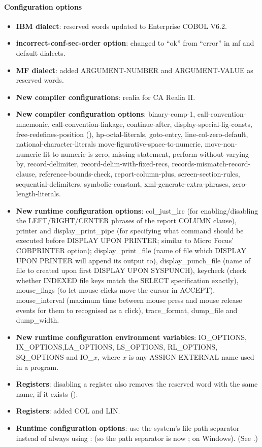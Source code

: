 \paragraph{Configuration options}
\begin{itemize}
\item \textbf{IBM dialect}: reserved words updated to Enterprise COBOL V6.2.
\item \textbf{incorrect-conf-sec-order option}: changed to ``ok'' from ``error'' in mf and default dialects.
\item \textbf{MF dialect}: added ARGUMENT-NUMBER and ARGUMENT-VALUE as reserved words.
\item \textbf{New compiler configurations}: realia for CA Realia II.
\item \textbf{New compiler configuration options}: binary-comp-1, call-convention-mnemonic, call-convention-linkage, continue-after, display-special-fig-consts, free-redefines-position (), hp-octal-literals, goto-entry, line-col-zero-default, national-character-literals move-figurative-space-to-numeric, move-non-numeric-lit-to-numeric-is-zero, missing-statement, perform-without-varying-by, record-delimiter, record-delim-with-fixed-recs, records-mismatch-record-clause, reference-bounds-check, report-column-plus, screen-section-rules, sequential-delimiters, symbolic-constant, xml-generate-extra-phrases, zero-length-literals.
\item \textbf{New runtime configuration options}: col\_just\_lrc (for enabling\slash{}disabling the LEFT\slash{}RIGHT\slash{}CENTER phrases of the report COLUMN clause), printer and display\_print\_pipe (for specifying what command should be executed before DISPLAY UPON PRINTER; similar to Micro Focus' COBPRINTER option); display\_print\_file (name of file which DISPLAY UPON PRINTER will append its output to), display\_punch\_file (name of file to created upon first DISPLAY UPON SYSPUNCH), keycheck (check whether INDEXED file keys match the SELECT specification exactly), mouse\_flags (to let mouse clicks move the cursor in ACCEPT), mouse\_interval (maximum time between mouse press and mouse release events for them to recognised as a click), trace\_format, dump\_file and dump\_width.
\item \textbf{New runtime configuration environment variables}: IO\_OPTIONS, IX\_OPTIONS,\linebreak LA\_OPTIONS, LS\_OPTIONS, RL\_OPTIONS, SQ\_OPTIONS and IO\_$x$, where $x$ is any ASSIGN EXTERNAL name used in a program.
\item \textbf{Registers}: disabling a register also removes the reserved word with the same name, if it exists ().
\item \textbf{Registers}: added COL and LIN.
\item \textbf{Runtime configuration options}: use the system's file path separator instead of always using : (so the path separator is now ; on Windows). (See .)
\end{itemize}

